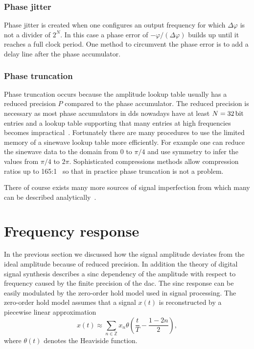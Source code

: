 \subsubsection{Phase jitter}

Phase jitter is created when one configures an output frequency for which
$\Delta\varphi$ is not a divider of $2^N$. In this case a phase error of
$-\varphi/(\Delta\varphi)$ builds up until it reaches a full clock period. One
method to circumvent the phase error is to add a delay line after the phase
accumulator\cite{Vankka2013}.

\subsubsection{Phase truncation}

Phase truncation occurs because the amplitude lookup table usually has a
reduced precision $P$ compared to the phase accumulator. The reduced precision
is necessary as most phase accumulators in \gls{dds} nowadays have at least 
$N=\SI{32}{\bit}$ entries and a lookup table supporting that many entries at
high frequencies becomes impractical~\cite{Cordesses2004}. Fortunately there
are many procedures to use the limited memory of a sinewave lookup table
more efficiently. For example one can reduce the sinewave data to the domain
from $0$ to $\pi/4$ and use symmetry to infer the values from $\pi/4$ to
$2\pi$. Sophisticated compressions methods allow compression ratios up to
165:1~\cite{Cordesses2004} so that in practice phase truncation is not a
problem.

There of course exists many more sources of signal imperfection from which
many can be described analytically~\cite{Goldberg1994}. 

\section{Frequency response}

In the previous section we discussed how the signal amplitude deviates from
the ideal amplitude because of reduced precision. In addition the theory of
digital signal synthesis describes a sinc dependency of the amplitude with
respect to frequency caused by the finite precision of the \gls{dac}. The
sinc response can be easily modulated by the zero-order hold model used
in signal processing. The zero-order hold model assumes that a signal $x(t)$
is reconstructed by a piecewise linear approximation
\begin{equation}
  x(t)
  \approx
  \sum_{n\in\mathbb{Z}}x_n\theta\left(\frac{t}{T}-\frac{1-2n}{2}\right),
\end{equation}
where $\theta(t)$ denotes the Heaviside function.

